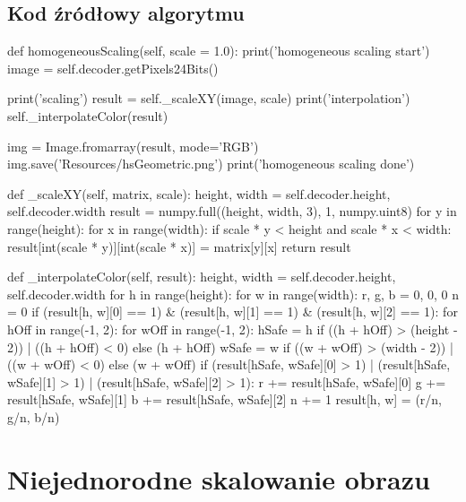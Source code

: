 \documentclass[a4paper,12pt]{book}
\begin{document}
\subsection*{Kod źródłowy algorytmu}
\begin{python}
def homogeneousScaling(self, scale = 1.0):
	print('homogeneous scaling start')
	image = self.decoder.getPixels24Bits()
	
	print('scaling')
	result = self._scaleXY(image, scale)
	print('interpolation')
	self._interpolateColor(result)
	
	img = Image.fromarray(result, mode='RGB')
	img.save('Resources/hsGeometric.png')
	print('homogeneous scaling done')

def _scaleXY(self, matrix, scale):
	height, width = self.decoder.height, self.decoder.width
	result = numpy.full((height, width, 3), 1, numpy.uint8)
	for y in range(height):
		for x in range(width):  
			if scale * y < height and scale * x < width:
				result[int(scale * y)][int(scale * x)] = matrix[y][x]
	return result

def _interpolateColor(self, result):
	height, width = self.decoder.height, self.decoder.width
	for h in range(height):
		for w in range(width):
			r, g, b = 0, 0, 0
			n = 0
			if (result[h, w][0] == 1) & (result[h, w][1] == 1) & (result[h, w][2] == 1):
				for hOff in range(-1, 2):
					for wOff in range(-1, 2):
						hSafe = h if ((h + hOff) > (height - 2)) | ((h + hOff) < 0) else (h + hOff)
						wSafe = w if ((w + wOff) > (width - 2)) | ((w + wOff) < 0) else (w + wOff)
						if (result[hSafe, wSafe][0] > 1) | (result[hSafe, wSafe][1] > 1) | (result[hSafe, wSafe][2] > 1):
							r += result[hSafe, wSafe][0]
							g += result[hSafe, wSafe][1]
							b += result[hSafe, wSafe][2]
							n += 1
				result[h, w] = (r/n, g/n, b/n)
\end{python}
\section{Niejednorodne skalowanie obrazu}
\end{document}

